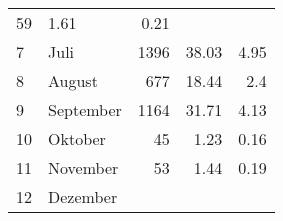 \begin{longtable}{lXrrr}
       \num{59} &
       \num[round-mode=places,round-precision=2]{1,61} &
         \num[round-mode=places,round-precision=2]{0,21} \\

     7 &
     \multicolumn{1}{X}{ Juli   } &


       \num{1396} &
       \num[round-mode=places,round-precision=2]{38,03} &
         \num[round-mode=places,round-precision=2]{4,95} \\

     8 &
     \multicolumn{1}{X}{ August   } &


       \num{677} &
       \num[round-mode=places,round-precision=2]{18,44} &
         \num[round-mode=places,round-precision=2]{2,4} \\

     9 &
     \multicolumn{1}{X}{ September   } &


       \num{1164} &
       \num[round-mode=places,round-precision=2]{31,71} &
         \num[round-mode=places,round-precision=2]{4,13} \\

     10 &
     \multicolumn{1}{X}{ Oktober   } &


       \num{45} &
       \num[round-mode=places,round-precision=2]{1,23} &
         \num[round-mode=places,round-precision=2]{0,16} \\

     11 &
     \multicolumn{1}{X}{ November   } &


       \num{53} &
       \num[round-mode=places,round-precision=2]{1,44} &
         \num[round-mode=places,round-precision=2]{0,19} \\

     12 &
     \multicolumn{1}{X}{ Dezember   } &



\end{longtable}
